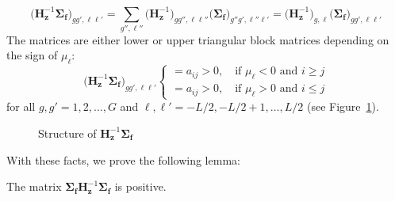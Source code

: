 \begin{equation}
	\big ( \mathbf{H}_{\mathbf{z}}^{-1} \mathbf{\Sigma_{f}} \big )_{gg',\ell\ell'} = \sum_{g'',\ell''} \big (\mathbf{H}_{\mathbf{z}}^{-1} \big )_{gg'',\ell \ell''}  \big (\mathbf{\Sigma_{f}} \big)_{g''g',\ell'' \ell'} = \big ( \mathbf{H}_{\mathbf{z}}^{-1} \big )_{g,\ell} \big ( \mathbf{\Sigma_{f}} \big )_{gg',\ell \ell'}
 \end{equation}
The matrices are either lower or upper triangular block matrices depending on the sign of $\mu_{\ell}$:
\begin{equation}
		\big ( \mathbf{H}_{\mathbf{z}}^{-1} \mathbf{\Sigma_{f}} \big )_{gg',\ell \ell'}
	\begin{cases}
 		= a_{ij} > 0, \quad \text{if } \mu_{\ell} < 0 \text{ and } i \geq j \\
 		= a_{ij} > 0, \quad \text{if } \mu_{\ell} > 0 \text{ and } i \leq j
	\end{cases}
\end{equation}
for all $g, g' = 1, 2, \dots, G$ and $\ell, \ell' = -L/2, -L/2+1, \dots, L/2$ (see Figure~\ref{fig:iHF}). 

\clearpage

\begin{figure}[!htbp]
	\centering
	\resizebox{0.75\textwidth}{!}{}
	\caption{Structure of $\mathbf{H}_{\mathbf{z}}^{-1}\mathbf{\Sigma_{f}}$}\label{fig:iHF}
\end{figure}

With these facts, we prove the following lemma:

\begin{lemma}
	The matrix $\mathbf{\Sigma_{f}}\mathbf{H}_{\mathbf{z}}^{-1}\mathbf{\Sigma_{f}}$ is positive.
	\label{lemma:FiHF}
\end{lemma}

